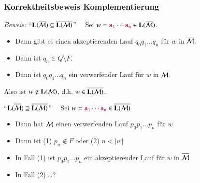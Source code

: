 \documentclass[onlymath]{beamer}
\begin{document}
\begin{frame}\frametitle{Korrektheitsbeweis Komplementierung}

\pause

\emph{Beweis:} "`$\textbf{\textcolor{black}{L}}(\overline{\mathcal{M}}) \subseteq \overline{\textbf{\textcolor{black}{L}}(\mathcal{M})}$"'~~
Sei $w=\mathtt{\textcolor{purple}{a_1}}\cdots\mathtt{\textcolor{purple}{a_n}}\in\textbf{\textcolor{black}{L}}(\overline{\mathcal{M}})$.\pause
\begin{itemize}
\item Dann gibt es einen akzeptierenden Lauf $q_0q_1\ldots q_n$ für $w$ in $\overline{\mathcal{M}}$.\pause
\item Dann ist $q_n\in Q\setminus F$.\pause
\item Dann ist $q_0q_1\ldots q_n$ ein verwerfender Lauf für $w$ in $\mathcal{M}$.\pause
\end{itemize}
Also ist $w\notin{\textbf{\textcolor{black}{L}}(\ensuremath{\mathcal{M}})}$, d.h. $w\in\overline{\textbf{\textcolor{black}{L}}(\mathcal{M})}$.\pause
\bigskip

"`$\textbf{\textcolor{black}{L}}(\overline{\mathcal{M}}) \supseteq \overline{\textbf{\textcolor{black}{L}}(\mathcal{M})}$"'~~
Sei $w=\mathtt{\textcolor{purple}{a_1}}\cdots\mathtt{\textcolor{purple}{a_n}}\in\overline{\textbf{\textcolor{black}{L}}(\mathcal{M})}$\pause

\begin{itemize}
\item Dann hat $\mathcal{M}$ einen verwerfenden Lauf $p_0p_1\ldots p_n$ für $w$\pause
\item Dann ist (1) $p_n\notin F$ oder (2) $n<|w|$\pause
\item In Fall (1) ist $p_0p_1\ldots p_n$ ein akzeptierender Lauf für $w$ in $\overline{\mathcal{M}}$\pause
\item In Fall (2) \ldots ?\pause
\end{itemize}


\end{frame}
\end{document}
